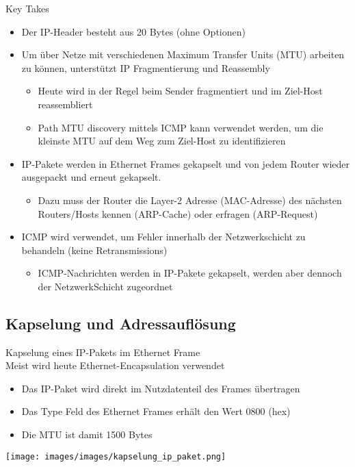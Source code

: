 \begin{KR}{Key Takes}
    \begin{itemize}
        \item Der IP-Header besteht aus 20 Bytes (ohne Optionen)
        \item Um über Netze mit verschiedenen Maximum Transfer Units (MTU) arbeiten zu können, unterstützt IP Fragmentierung und Reassembly
        \begin{itemize}
            \item Heute wird in der Regel beim Sender fragmentiert und im Ziel-Host reassembliert
            \item Path MTU discovery mittels ICMP kann verwendet werden, um die kleinste MTU auf dem Weg zum Ziel-Host zu identifizieren
        \end{itemize}
        \item IP-Pakete werden in Ethernet Frames gekapselt und von jedem Router wieder ausgepackt und erneut gekapselt.
        \begin{itemize}
            \item Dazu muss der Router die Layer-2 Adresse (MAC-Adresse) des nächsten Routers/Hosts kennen (ARP-Cache) oder erfragen (ARP-Request)
        \end{itemize}
        \item ICMP wird verwendet, um Fehler innerhalb der Netzwerkschicht zu behandeln (keine Retransmissions)
        \begin{itemize}
            \item ICMP-Nachrichten werden in IP-Pakete gekapselt, werden aber dennoch der NetzwerkSchicht zugeordnet
        \end{itemize}
    \end{itemize}
\end{KR}

\columnbreak

\subsection{Kapselung und Adressauflösung}

\begin{definition}{Kapselung eines IP-Pakets im Ethernet Frame}\\
    Meist wird heute Ethernet-Encapsulation verwendet
    \begin{itemize}
        \item Das IP-Paket wird direkt im Nutzdatenteil des Frames übertragen
        \item Das Type Feld des Ethernet Frames erhält den Wert 0800 (hex)
        \item Die MTU ist damit 1500 Bytes
    \end{itemize}
        \texttt{[image: images/images/kapselung\_ip\_paket.png]}
\end{definition}

